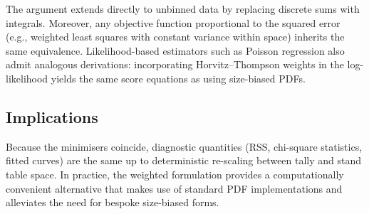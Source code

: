 \documentclass[12pt,letterpaper,leqno]{article}
\theoremstyle{plain}
\begin{document}
The argument extends directly to unbinned data by replacing discrete sums with
integrals. Moreover, any objective function proportional to the squared error
(e.g., weighted least squares with constant variance within space) inherits the
same equivalence. Likelihood-based estimators such as Poisson regression also
admit analogous derivations: incorporating Horvitz--Thompson weights in the log-
likelihood yields the same score equations as using size-biased PDFs.

\subsection*{Implications}

Because the minimisers coincide, diagnostic quantities (RSS, chi-square
statistics, fitted curves) are the same up to deterministic re-scaling between
tally and stand table space. In practice, the weighted formulation provides a
computationally convenient alternative that makes use of standard PDF
implementations and alleviates the need for bespoke size-biased forms.



\end{document}
